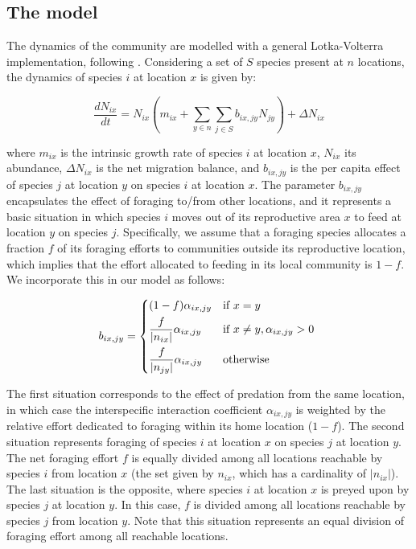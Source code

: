 \subsection*{The model}

The dynamics of the community are modelled with a general Lotka-Volterra implementation, following \cite{Gravel2016a}. Considering a set of $S$ species present at $n$ locations, the dynamics of species $i$ at location $x$ is given by:

\begin{equation}
\frac{dN_{ix}}{dt} = N_{ix}(m_{ix} + \sum_{y \in n} \sum_{j \in S} b_{ix,jy} N_{jy}) + \Delta N_{ix}
\end{equation}

where $m_{ix}$ is the intrinsic growth rate of species $i$ at location $x$, $N_{ix}$ its abundance, $\Delta N_{ix}$ is the net migration balance, and $b_{ix,jy}$ is the per capita effect of species $j$ at location $y$ on species $i$ at location $x$. The parameter $b_{ix,jy}$ encapsulates the effect of foraging to/from other locations, and it represents a basic situation in which species $i$ moves out of its reproductive area $x$ to feed at location $y$ on species $j$. Specifically, we assume that a foraging species allocates a fraction $f$ of its foraging efforts to communities outside its reproductive location, which implies that the effort allocated to feeding in its local community is $1-f$. We incorporate this in our model as follows:

\begin{equation}
b_{ix,jy} =
\begin{dcases*}
   (1-f)\alpha_{ix,jy}        		& if $x = y$ \\
   \frac{f}{\vert n_{ix} \vert}\alpha_{ix,jy}     & if $x \neq y, \alpha_{ix,jy} > 0$ \\
   \frac{f}{\vert n_{jy} \vert} \alpha_{ix,jy}    & otherwise
\end{dcases*}
\end{equation}

The first situation corresponds to the effect of predation from the same location, in which case the interspecific interaction coefficient $\alpha_{ix,jy}$ is weighted by the relative effort dedicated to foraging within its home location ($1-f$). The second situation represents foraging of species $i$ at location $x$ on species $j$ at location $y$. The net foraging effort $f$ is equally divided among all locations reachable by species $i$ from location $x$ (the set given by $n_{ix}$, which has a cardinality of $\vert n_{ix} \vert$). The last situation is the opposite, where species $i$ at location $x$ is preyed upon by species $j$ at location $y$. In this case, $f$ is divided among all locations reachable by species $j$ from location $y$. Note that this situation represents an equal division of foraging effort among all reachable locations.

